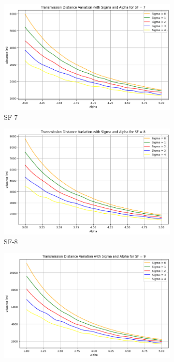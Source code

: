  
        \begin{figure}
     \centering
     \begin{subfigure}[b]{0.45\textwidth}
         \centering
         \includegraphics[width=\textwidth]{images/sigma - 7.jpg}
         \caption{SF-7}
         \label{fig:sf-7}
     \end{subfigure}
     \hfill
     \begin{subfigure}[b]{0.45\textwidth}
         \centering
         \includegraphics[width=\textwidth]{images/sigma - 8.jpg}
         \caption{SF-8}
         \label{fig:SF-8}
     \end{subfigure}
     \hfill
     \begin{subfigure}[b]{0.45\textwidth}
         \centering
         \includegraphics[width=\textwidth]{images/sigma - 9.jpg}

\end{subfigure}
\end{figure}
